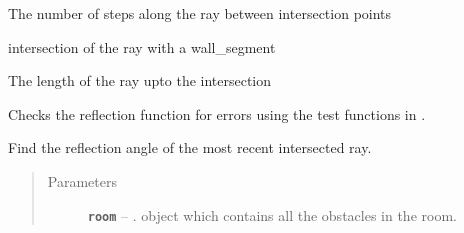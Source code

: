 \documentclass[letterpaper,10pt,english]{sphinxmanual}
\begin{document}
\begin{fulllineitems}
\begin{fulllineitems}
\label{index:Rays.Ray.number_steps}
The number of steps along the ray between intersection points

\end{fulllineitems}


\begin{fulllineitems}
\label{index:Rays.Ray.obst_collision_point}
intersection of the ray with a wall\_segment

\end{fulllineitems}


\begin{fulllineitems}
\label{index:Rays.Ray.ray_length}
The length of the ray upto the intersection

\end{fulllineitems}


\begin{fulllineitems}
\label{index:Rays.Ray.raytest}
Checks the reflection function for errors using the test     functions in {\hyperref[index:module\string-reflection]{}}.

\end{fulllineitems}


\begin{fulllineitems}
\label{index:Rays.Ray.ref_angle}
Find the reflection angle of the most recent intersected ray.
\begin{quote}\begin{description}
\item[{Parameters}] \leavevmode
\textbf{\texttt{room}} -- {\hyperref[index:module\string-Room]{}}.  object which     contains all the obstacles in the room.


\end{description}
\end{quote}
\end{fulllineitems}
\end{fulllineitems}
\end{document}
